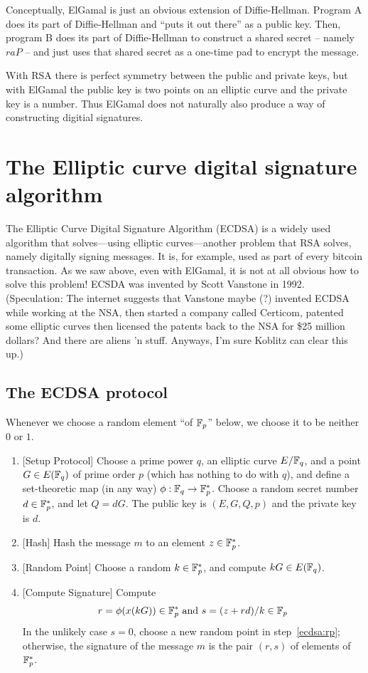 \documentclass{book}
\begin{document}
Conceptually, ElGamal is just an obvious extension of Diffie-Hellman.
Program A does its part of Diffie-Hellman
and ``puts it out there'' as a public key.
Then, program B does its part of Diffie-Hellman to construct a shared
secret -- namely $raP$ -- and just uses that shared secret as a one-time
pad to encrypt the message.

With RSA there is perfect symmetry between the public and private keys, but
with ElGamal the public key is two points on an elliptic curve and the private
key is a number.  Thus ElGamal does not naturally also produce
a way of constructing digitial signatures.

\section{The Elliptic curve digital signature algorithm}

The Elliptic Curve Digital Signature Algorithm (ECDSA) is a widely used
algorithm that solves---using elliptic curves---another problem that RSA solves, namely
digitally signing messages.
It is, for example, used as part of every bitcoin transaction.
As we saw above, even
with ElGamal, it is not at all obvious how to solve this problem!
ECSDA was invented by Scott Vanstone in 1992. (Speculation:
The internet suggests that
Vanstone maybe (?) invented ECDSA while working at the NSA,
then started a company called Certicom, patented some elliptic curves
then licensed the patents back to the NSA for \$25 million dollars?
And there are aliens 'n stuff.  Anyways, I'm sure Koblitz can clear this up.)


\subsection{The ECDSA protocol}
Whenever we choose a random element ``of $\mathbb{F}_p$'' below, we choose it to be neither $0$ or $1$.

\begin{enumerate}
\item{}[Setup Protocol]
Choose a prime power $q$, an elliptic curve $E/\mathbb{F}_q$, and a
point $G \in E(\mathbb{F}_q)$ of prime order $p$ (which has nothing to do with $q$),
and define a set-theoretic map (in any way) $\phi:\mathbb{F}_q \to \mathbb{F}_p^*$.
Choose a random secret number $d \in \mathbb{F}_p^*$,
and let $Q=dG$.
The public key is $(E,G,Q,p)$ and the private key is $d$.
\item{}[Hash] Hash the message $m$ to an element $z\in \mathbb{F}_p^*$.
\item\label{ecdsa:rp}{}[Random Point] Choose a random $k\in \mathbb{F}_p^*$, and compute $kG \in E(\mathbb{F}_q)$.
\item{}[Compute Signature] Compute
$$r=\phi(x(kG))\in \mathbb{F}_p^*\text { and }
s=(z+r d)/k \in \mathbb{F}_p$$
In the unlikely case
$s=0$, choose a new random point in step~\ref{ecdsa:rp};
otherwise, the signature of the message
$m$ is the pair $(r,s)$ of elements of $\mathbb{F}_p^*$.
\end{enumerate}
\end{document}
